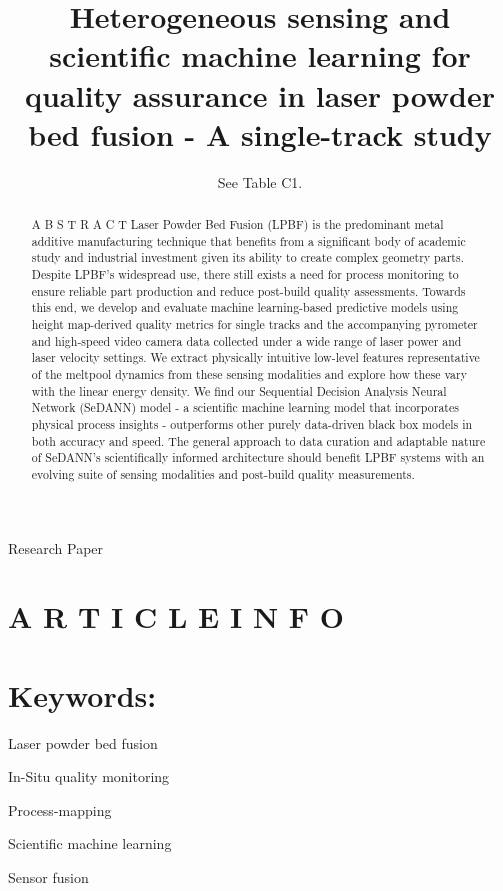 \documentclass[10pt]{article}
\title{Heterogeneous sensing and scientific machine learning for quality assurance in laser powder bed fusion - A single-track study }
\author{See Table C1.}
\date{}
\begin{document}
\maketitle
Research Paper



\section*{A R T I C L E I N F O}
\section*{Keywords:}
Laser powder bed fusion

In-Situ quality monitoring

Process-mapping

Scientific machine learning

Sensor fusion

\begin{abstract}
A B S T R A C T Laser Powder Bed Fusion (LPBF) is the predominant metal additive manufacturing technique that benefits from a significant body of academic study and industrial investment given its ability to create complex geometry parts. Despite LPBF's widespread use, there still exists a need for process monitoring to ensure reliable part production and reduce post-build quality assessments. Towards this end, we develop and evaluate machine learning-based predictive models using height map-derived quality metrics for single tracks and the accompanying pyrometer and high-speed video camera data collected under a wide range of laser power and laser velocity settings. We extract physically intuitive low-level features representative of the meltpool dynamics from these sensing modalities and explore how these vary with the linear energy density. We find our Sequential Decision Analysis Neural Network (SeDANN) model - a scientific machine learning model that incorporates physical process insights - outperforms other purely data-driven black box models in both accuracy and speed. The general approach to data curation and adaptable nature of SeDANN's scientifically informed architecture should benefit LPBF systems with an evolving suite of sensing modalities and post-build quality measurements.
\end{abstract}
\end{document}
